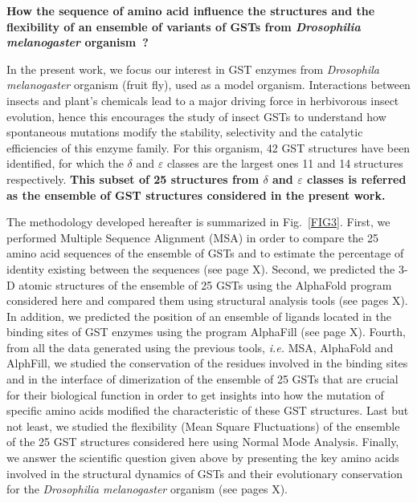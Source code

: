 \vspace{.15cm}
\begin{tcolorbox}[width=\textwidth,colback={gray!20!white},title={\textbf{Scientific Question}},outer arc=0mm,colupper=black]    
	\centering
	\textbf{How the sequence of amino acid influence the structures and the flexibility of an ensemble of variants of GSTs from \textit{Drosophilia melanogaster} organism~?}
\end{tcolorbox}

In the present work, we focus our interest in GST enzymes from \textit{Drosophila melanogaster} organism (fruit fly), used as a model organism. Interactions between insects and plant’s chemicals lead to a major driving force in herbivorous insect evolution, hence this encourages the study of insect GSTs to understand how spontaneous mutations modify the stability, selectivity and the catalytic efficiencies of this enzyme family. For this organism, 42 GST structures have been identified\cite{F-Neiers-GSTs}, for which the $\delta$ and $\varepsilon$ classes are the largest ones 11 and 14 structures respectively. \textbf{This subset of 25 structures from $\delta$ and $\varepsilon$ classes is referred as the ensemble of GST structures considered in the present work.}

The methodology developed hereafter is summarized in Fig.~\ref{FIG3}. First, we performed Multiple Sequence Alignment (MSA) in order to compare the 25 amino acid sequences of the ensemble of GSTs and to estimate the percentage of identity existing between the sequences (see page X). Second, we predicted the 3-D atomic structures of the ensemble of 25 GSTs using the AlphaFold program considered here and compared them using structural analysis tools (see pages X). In addition, we predicted the position of an ensemble of ligands located in the binding sites of GST enzymes using the program AlphaFill (see page X). Fourth, from all the data generated using the previous tools, \textit{i.e.} MSA, AlphaFold and AlphFill, we studied the conservation of the residues involved in the binding sites and in the interface of dimerization of the ensemble of 25 GSTs that are crucial for their biological function in order to get insights into how the mutation of specific amino acids modified the characteristic of these GST structures. Last but not least, we studied the flexibility (Mean Square Fluctuations) of the ensemble of the 25 GST structures considered here using Normal Mode Analysis. Finally, we answer the scientific question given above by presenting the key amino acids involved in the structural dynamics of GSTs and their evolutionary conservation for the \textit{Drosophilia melanogaster} organism (see pages X).

